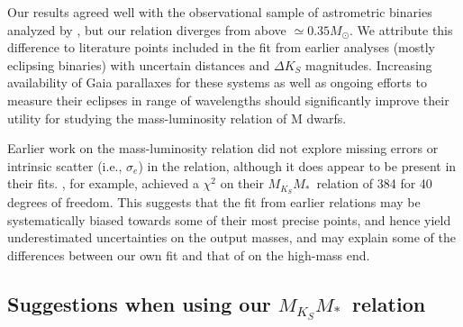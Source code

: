 \documentclass[twocolumn]{aastex62}
\newcommand{\mmk}{$M_{K_S}$\textendash$M_*$}
\begin{document}
Our results agreed well with the observational sample of astrometric binaries analyzed by \citet{Benedict2016}, but our relation diverges from \citet{Benedict2016} above $\simeq0.35M_\odot$. We attribute this difference to literature points included in the \citet{Benedict2016} fit from earlier analyses (mostly eclipsing binaries) with uncertain distances and $\Delta K_S$ magnitudes. Increasing availability of Gaia parallaxes for these systems as well as ongoing efforts to measure their eclipses in range of wavelengths \citep[e.g.,][]{2017AJ....154..100H} should significantly improve their utility for studying the mass-luminosity relation of M dwarfs.

Earlier work on the mass-luminosity relation did not explore missing errors or intrinsic scatter (i.e., $\sigma_e$) in the relation, although it does appear to be present in their fits. \citet{Benedict2016}, for example, achieved a $\chi^2$ on their \mmk\ relation of 384 for 40 degrees of freedom. This suggests that the fit from earlier relations may be systematically biased towards some of their most precise points, and hence yield underestimated uncertainties on the output masses, and may explain some of the differences between our own fit and that of \citet{Benedict2016} on the high-mass end. 


\subsection{Suggestions when using our \mmk\ relation}\label{sec:caveats}
\end{document}
